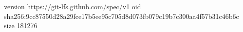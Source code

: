 version https://git-lfs.github.com/spec/v1
oid sha256:9cc87550d28a29fce17b5ee95c705d8d073fb079c19b7c300aa4f57b31c46b6c
size 181276
